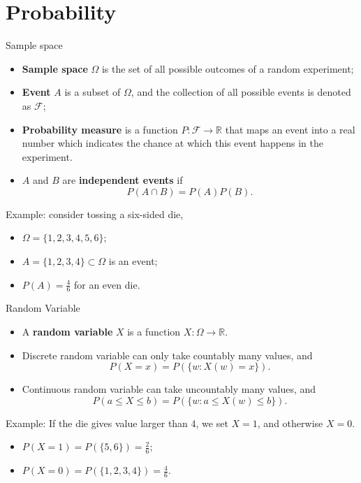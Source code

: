\documentclass[10pt]{beamer}
\begin{document}
\section{Probability}
\begin{frame}{Sample space}
    \begin{itemize}
        \item \textbf{Sample space} $\Omega$ is the set of all possible outcomes of a random experiment;
        \item \textbf{Event} $A$ is a subset of $\Omega$, and the collection of all possible events is denoted as $\mathcal{F}$;
        \item \textbf{Probability measure} is a function $P: \mathcal{F} \to \mathbb{R}$ that maps an event into a real number which indicates the chance at which this event happens in the experiment.
        \item $A$ and $B$ are \textbf{independent events} if 
        \[
            P(A \cap B) = P(A)P(B). 
        \]
    \end{itemize}
    Example:  consider tossing a six-sided die, 
    \begin{itemize}
        \item $\Omega = \{1, 2, 3, 4, 5, 6\}$;
        \item $A = \{1, 2, 3, 4\} \subset \Omega$ is an event;
        \item $P(A) = \frac{4}{6}$ for an even die.
    \end{itemize}
\end{frame}

\begin{frame}{Random Variable}
    \begin{itemize}
        \item A \textbf{random variable} $X$ is a function $X: \Omega \to \mathbb{R}$. 
        \item Discrete random variable can only take countably many values, and 
        \[
            P(X = x) = P(\{w: X(w) = x\}).
        \]
        \item Continuous random variable can take uncountably many values, and 
        \[
            P(a \le X \le b) = P(\{w: a \le X(w) \le b\}).
        \]
    \end{itemize}
    Example: If the die gives value larger than 4, we set $X = 1$, and otherwise $X = 0$.
    \begin{itemize}
        \item $P(X = 1) = P(\{5, 6\}) = \frac{2}{6}$;
        \item $P(X = 0) = P(\{1, 2, 3, 4\}) = \frac{4}{6}$.
    \end{itemize}
\end{frame}
\end{document}

